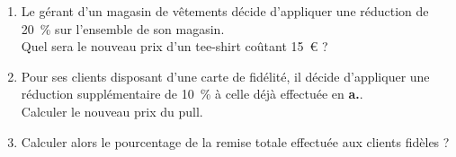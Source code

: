 \documentclass[a4paper]{book}
\begin{document}
    \begin{exercice}
        \begin{enumerate}
            \item Le gérant d'un magasin de vêtements décide d'appliquer une réduction de 20~\% sur l'ensemble de son magasin. \\
            Quel sera le nouveau prix d'un tee-shirt coûtant 15~€ ?
            
            \item Pour ses clients disposant d'une carte de fidélité, il décide d'appliquer une réduction supplémentaire de 10~\% à celle déjà effectuée en \textbf{a.}. \\
            Calculer le nouveau prix du pull.
            
            \item Calculer alors le pourcentage de la remise totale effectuée aux clients fidèles ?
        \end{enumerate}
    \end{exercice}  
\end{document}
